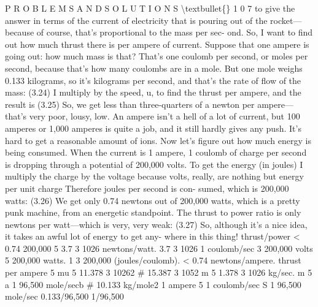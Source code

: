 \documentclass[10pt,oneside]{article}
\begin{document}
P R O B L E M S  A N D  S O L U T I O N S \textbackslash{}textbullet\{\} 1 0 7 to give the answer in terms of the current of electricity that is pouring out of the rocket---because of course, that’s proportional to the mass per sec- ond. So, I want to find out how much thrust there is per ampere of current. Suppose that one ampere is going out: how much mass is that? That’s one coulomb per second, or moles per second, because that’s how many coulombs are in a mole. But one mole weighs 0.133 kilograms, so it’s kilograms per second, and that’s the rate of flow of the mass: (3.24) I multiply by the speed, u, to find the thrust per ampere, and the result is (3.25) So, we get less than three-quarters of a newton per ampere---that’s very poor, lousy, low. An ampere isn’t a hell of a lot of current, but 100 amperes or 1,000 amperes is quite a job, and it still hardly gives any push. It’s hard to get a reasonable amount of ions. Now let’s figure out how much energy is being consumed. When the current is 1 ampere, 1 coulomb of charge per second is dropping through a potential of 200,000 volts. To get the energy (in joules) I multiply the charge by the voltage because volts, really, are nothing but energy per unit charge Therefore joules per second is con- sumed, which is 200,000 watts: (3.26) We get only 0.74 newtons out of 200,000 watts, which is a pretty punk machine, from an energetic standpoint. The thrust to power ratio is only newtons per watt---which is very, very weak: (3.27) So, although it’s a nice idea, it takes an awful lot of energy to get any- where in this thing! thrust/power < 0.74 200,000 5 3.7 3 1026 newtons/watt. 3.7 3 1026 1 coulomb/sec 3 200,000 volts 5 200,000 watts. 1 3 200,000 (joules/coulomb). < 0.74 newtons/ampere. thrust per ampere 5 mu 5 11.378 3 10262 \# 15.387 3 1052 m 5 1.378 3 1026 kg/sec. m 5 a 1 96,500 mole/secb \# 10.133 kg/mole2 1 ampere 5  1 coulomb/sec S 1 96,500 mole/sec 0.133/96,500 1/96,500\par
\end{document}
